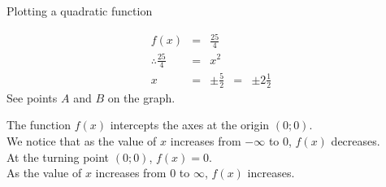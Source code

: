 \begin{wex}{Plotting a quadratic function}
{
\begin{equation*}
 \begin{array}{ccl}
f(x) &=& \frac{25}{4} \\
\therefore \frac{25}{4} &=& x^{2} \\
x &=& \pm \frac{5}{2} 
  &=& \pm 2\frac{1}{2} 
\end{array}
\end{equation*}
See points $A$ and $B$ on the graph.

The function $f(x)$ intercepts the axes at the origin $(0;0)$.\\
We notice that as the value of $x$ increases from $-\infty$ to $0$, $f(x)$ decreases.\\
At the turning point $(0;0)$, $f(x) = 0$. \\
As the value of $x$ increases from $0$ to $\infty$, $f(x)$ increases.
}
\end{wex}

\clearpage
